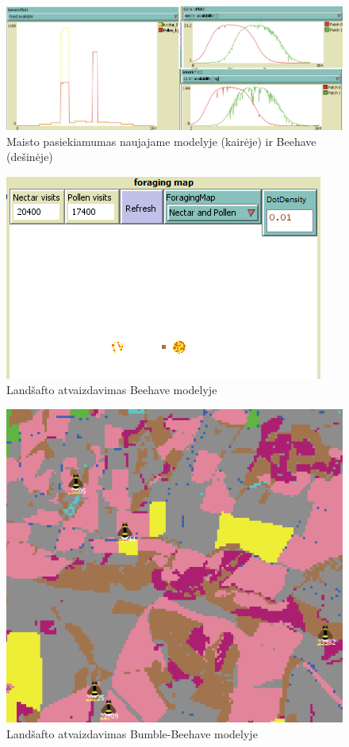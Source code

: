 \documentclass{VUMIFKompMagistrinis}
\begin{document}
\begin{figure}[H]
    \centering
    \includegraphics[scale=0.5]{img/mtd3/mtdp3v11-img004.png}
    \caption{Maisto pasiekiamumas naujajame modelyje (kairėje) ir Beehave (dešinėje)}
    \label{img:m4}
\end{figure}

\begin{figure}[H]
    \centering
    \includegraphics[scale=0.75]{img/mtd3/mtdp3v11-img005.png}
    \caption{Landšafto atvaizdavimas Beehave modelyje}
    \label{img:m5}
\end{figure}

\begin{figure}[H]
    \centering
    \includegraphics[scale=0.75]{img/mtd3/mtdp3v11-img006.png}
    \caption{Landšafto atvaizdavimas Bumble-Beehave modelyje}
    \label{img:m6}
\end{figure}
\end{document}
